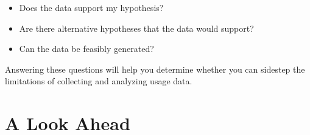 \begin{itemize}
  \item Does the data support my hypothesis?
  \item Are there alternative hypotheses that the data would support?
  \item Can the data be feasibly generated?
\end{itemize}

\noindent
Answering these questions will help you determine whether you can sidestep
the limitations of collecting and analyzing usage data.

%
%
%

\section{A Look Ahead}

